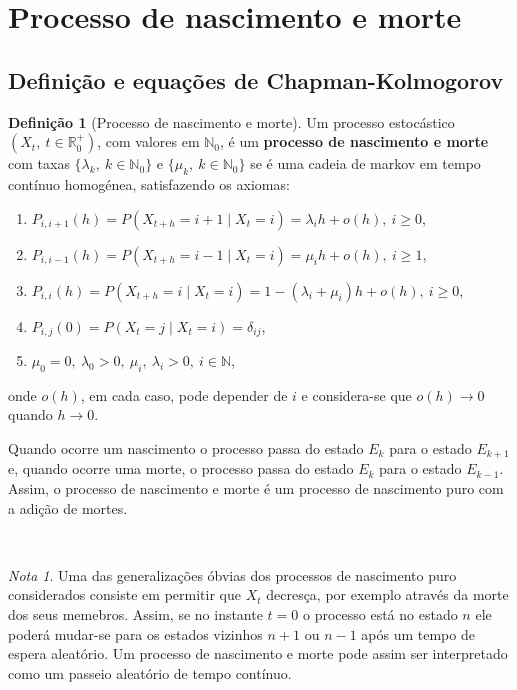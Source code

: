 \documentclass[
  11pt,
  a4paper,
]{book}
\theoremstyle{definition}
\newtheorem{definition}{Definição}[chapter]
\theoremstyle{definition}
\theoremstyle{definition}
\theoremstyle{definition}
\theoremstyle{remark}
\newtheorem*{remark}{Nota }
\begin{document}
\section{Processo de nascimento e morte}\label{processo-de-nascimento-e-morte}

\subsection{Definição e equações de Chapman-Kolmogorov}\label{definiuxe7uxe3o-e-equauxe7uxf5es-de-chapman-kolmogorov}

\begin{definition}[Processo de nascimento e morte]
Um processo estocástico \((X_t, ~ t \in \mathbb{R}_0^+)\), com valores em \(\mathbb{N}_0\), é um \textbf{processo de nascimento e morte} com taxas \(\{\lambda_k, ~k \in \mathbb{N}_0\}\) e \(\{\mu_k, ~k \in \mathbb{N}_0\}\) se é uma cadeia de markov em tempo contínuo homogénea, satisfazendo os axiomas:

\begin{enumerate}
\def\labelenumi{\arabic{enumi}.}
\item
  \(P_{i,i+1}(h)=P(X_{t+h}=i+1 \mid X_{t}=i)=\lambda_i h + o(h), ~i \geq 0\),
\item
  \(P_{i,i-1}(h)=P(X_{t+h}=i-1 \mid X_{t}=i)=\mu_i h + o(h), ~i \geq 1\),
\item
  \(P_{i,i}(h)=P(X_{t+h}=i \mid X_{t}=i)=1-(\lambda_i+\mu_i) h + o(h), ~ i \geq 0\),
\item
  \(P_{i,j}(0)=P(X_{t}=j \mid X_{t}=i)=\delta_{ij}\),
\item
  \(\mu_0=0, ~\lambda_0 >0, ~\mu_i, ~\lambda_i>0, ~i \in \mathbb{N}\),
\end{enumerate}

onde \(o(h)\), em cada caso, pode depender de \(i\) e considera-se que \(o(h) \to 0\) quando \(h \to 0\).

Quando ocorre um nascimento o processo passa do estado \(E_k\) para o estado \(E_{k+1}\) e, quando ocorre uma morte, o processo passa do estado \(E_k\) para o estado \(E_{k-1}\). Assim, o processo de nascimento e morte é um processo de nascimento puro com a adição de mortes.
\end{definition}

\(\,\)

\begin{remark}
Uma das generalizações óbvias dos processos de nascimento puro considerados consiste em permitir que \(X_t\) decresça, por exemplo através da morte dos seus memebros. Assim, se no instante \(t=0\) o processo está no estado \(n\) ele poderá mudar-se para os estados vizinhos \(n+1\) ou \(n-1\) após um tempo de espera aleatório. Um processo de nascimento e morte pode assim ser interpretado como um passeio aleatório de tempo contínuo.
\end{remark}
\end{document}
